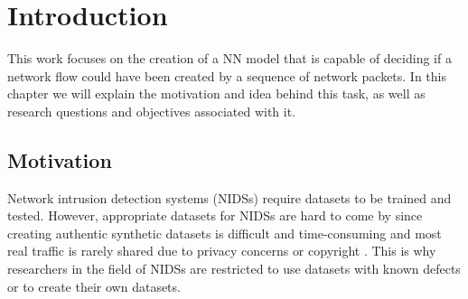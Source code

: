 \documentclass[
	ngerman,
	ruledheaders=section,%
	class=report,%
	thesis={type=bachelor},%
	accentcolor=9c,%
	custommargins=true,%
	marginpar=false,%
	parskip=half-,%
	fontsize=11pt,%
]{tudapub}
\begin{document}

\chapter{Introduction}
\label{sec:intro}

This work focuses on the creation of a NN model that is capable of deciding if a network flow could have been created by a sequence of network packets.
In this chapter we will explain the motivation and idea behind this task, as well as research questions and objectives associated with it.

\section{Motivation}
\label{sec:motivation}

Network intrusion detection systems (NIDSs) require datasets to be trained and tested.
However, appropriate datasets for NIDSs are hard to come by
since creating authentic synthetic datasets is difficult and time-consuming
and most real traffic is rarely shared due to privacy concerns \cite{ringFlowbasedNetworkTraffic2019a} or copyright \cite{corderoID2TDIYDataset2015}.
This is why researchers in the field of NIDSs are restricted to use datasets with known defects or to create their own datasets.
\end{document}
